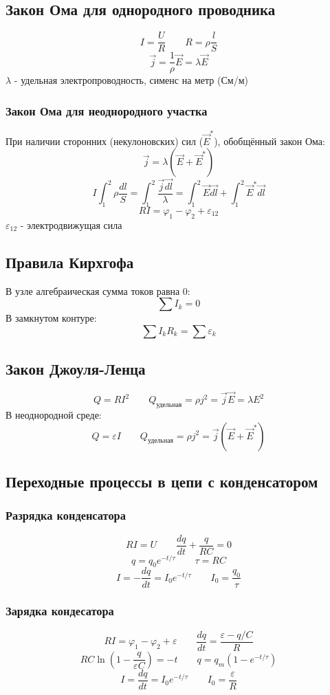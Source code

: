 \documentclass{article}
\begin{document}
\subsection{Закон Ома для однородного проводника}
\[I=\frac{U}{R} \qquad R=\rho\frac{l}{S}\]
\[\vec{j}=\frac{1}{\rho}\vec{E}=\lambda\vec{E}\]
$\lambda$ - удельная электропроводность, сименс на метр (См/м)
\subsubsection{Закон Ома для неоднородного участка}
При наличии сторонних (некулоновских) сил ($\vec{E}^{*}$), обобщённый закон Ома:
\[\vec{j}=\lambda(\vec{E}+\vec{E}^{*})\]
\[I\int_{1}^{2}\rho\frac{dl}{S}=\int_{1}^{2}\frac{\vec{j}\vec{dl}}{\lambda}=\int_{1}^{2}\vec{E}\vec{dl}+\int_{1}^{2}\vec{E}^{*}\vec{dl}\]
\[RI=\varphi_{1}-\varphi_{2}+\varepsilon_{12}\]
$\varepsilon_{12}$ - электродвижущая сила

\subsection{Правила Кирхгофа}
В узле алгебраическая сумма токов равна 0:
\[\sum I_{k}=0\]
В замкнутом контуре:
\[\sum I_{k}R_{k}=\sum\varepsilon_{k}\]

\subsection{Закон Джоуля-Ленца}
\[Q=RI^{2} \qquad Q_{\text{удельная}}=\rho j^{2}=\vec{j}\vec{E}=\lambda E^{2}\]
В неоднородной среде:
\[Q=\varepsilon I \qquad Q_{\text{удельная}}=\rho j^{2}=\vec{j}(\vec{E}+\vec{E}^{*})\]

\subsection{Переходные процессы в цепи с конденсатором}
\subsubsection{Разрядка конденсатора}
\[RI=U \qquad \frac{dq}{dt}+\frac{q}{RC}=0\]
\[q=q_{0}e^{-t/\tau} \qquad \tau=RC\]
\[I=-\frac{dq}{dt}=I_{0}e^{-t/\tau} \qquad I_{0}=\frac{q_{0}}{\tau}\]
\subsubsection{Зарядка кондесатора}
\[RI=\varphi_{1}-\varphi_{2}+\varepsilon \qquad \frac{dq}{dt}=\frac{\varepsilon-q/C}{R}\]
\[RC\ln(1-\frac{q}{\varepsilon C})=-t \qquad q=q_{m}(1-e^{-t/\tau})\]
\[I=\frac{dq}{dt}=I_{0}e^{-t/\tau} \qquad I_{0}=\frac{\varepsilon}{R}\]
\end{document}

